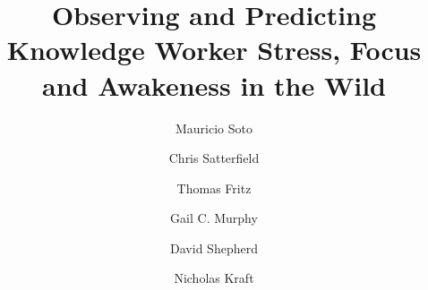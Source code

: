 \documentclass[final, 1p,times]{elsarticle}
\begin{document}
\begin{frontmatter}


\title{Observing and Predicting Knowledge Worker Stress, Focus and Awakeness in the Wild}


\author{Mauricio Soto}
\address{Hitachi ABB Power Grids, Raleigh, North Carolina}

\author{Chris Satterfield}
\address{The University of British Columbia, Vancouver, British Columbia}

\author{Thomas Fritz}
\address{University of Zurich, Zurich, Switzerland}

\author{Gail C. Murphy}
\address{The University of British Columbia, Vancouver, British Columbia }

\author{David Shepherd}
\address{Virginia Commonwealth University, Richmond, Virginia}

\author{Nicholas Kraft}
\address{UserVoice, Raleigh, North Carolina}



\end{frontmatter}
\end{document}
